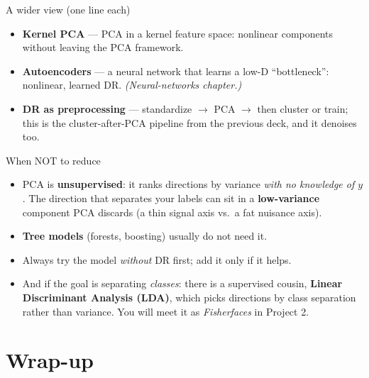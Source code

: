 \documentclass[aspectratio=169]{beamer}
\begin{document}
\begin{frame}{A wider view (one line each)}
  \begin{itemize}
    \item \textbf{Kernel PCA} --- PCA in a kernel feature space: nonlinear components without leaving
      the PCA framework.
    \item \textbf{Autoencoders} --- a neural network that learns a low-D ``bottleneck'': nonlinear,
      learned DR. \emph{(Neural-networks chapter.)}
    \item \textbf{DR as preprocessing} --- standardize $\to$ PCA $\to$ then cluster or train; this is
      the cluster-after-PCA pipeline from the previous deck, and it denoises too.
  \end{itemize}
\end{frame}

\begin{frame}{When NOT to reduce}
  \begin{itemize}\small
    \item PCA is \textbf{unsupervised}: it ranks directions by variance \emph{with no knowledge of
      $y$}. The direction that separates your labels can sit in a \textbf{low-variance} component PCA
      discards (a thin signal axis vs.\ a fat nuisance axis).
    \item \textbf{Tree models} (forests, boosting) usually do not need it.
    \item Always try the model \emph{without} DR first; add it only if it helps.
    \item And if the goal is separating \emph{classes}: there is a supervised cousin,
      \textbf{Linear Discriminant Analysis (LDA)}, which picks directions by class separation
      rather than variance. You will meet it as \emph{Fisherfaces} in Project 2.
  \end{itemize}
\end{frame}

\section*{Wrap-up}
\end{document}
